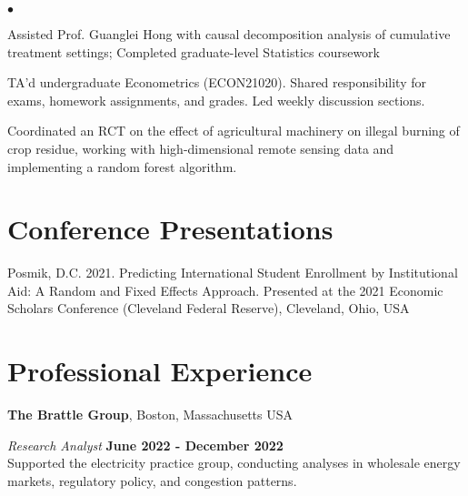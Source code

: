 \documentclass[margin,line]{res}
\newenvironment{list2}{
  \begin{list}{$\bullet$}{%
      \setlength{\itemsep}{0in}
      \setlength{\parsep}{0in} \setlength{\parskip}{0in}
      \setlength{\topsep}{0in} \setlength{\partopsep}{0in} 
      \setlength{\leftmargin}{0.2in}}}{\end{list}}
\begin{document}
\begin{resume}
\begin{list2}
\item Assisted Prof. Guanglei Hong with causal decomposition analysis of cumulative treatment settings; Completed graduate-level Statistics coursework
\item TA'd undergraduate Econometrics (ECON21020). Shared responsibility for exams, homework assignments, and grades. Led weekly discussion sections.  
\item Coordinated an RCT on the effect of agricultural machinery on illegal burning of crop residue, working with high-dimensional remote sensing data and implementing a random forest algorithm.  
\end{list2}



\section{\sc Conference Presentations}
Posmik, D.C. 2021. Predicting International Student Enrollment by Institutional Aid: A Random and Fixed Effects Approach. Presented at the 2021 Economic Scholars Conference (Cleveland Federal Reserve), Cleveland, Ohio, USA


\section{\sc Professional Experience}
{\bf The Brattle Group}, Boston, Massachusetts USA

\vspace{-.3cm}
{\em Research Analyst} \hfill {\bf June 2022 - December 2022}\\
Supported the electricity practice group, conducting analyses in wholesale energy markets, regulatory policy, and congestion patterns. 



\end{resume}
\end{document}
